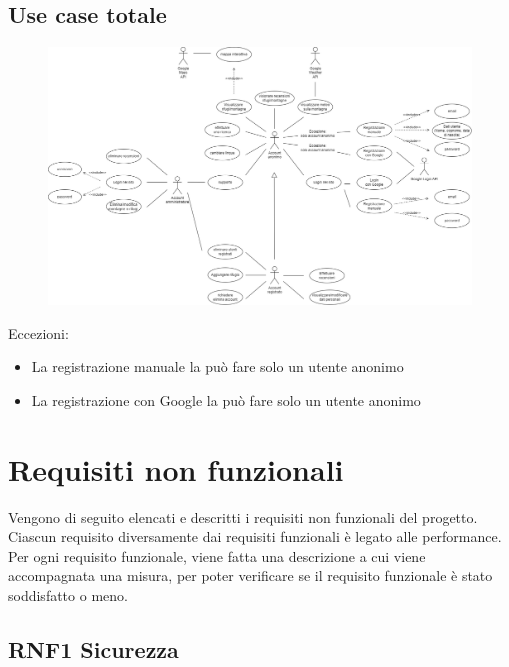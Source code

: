 \documentclass[a4paper,12pt]{article}
\begin{document}
\subsection*{Use case totale}
\begin{figure}[H]
   \centering
    \includegraphics[width=1.4\textwidth, angle = 90]{img-D2/use_case_completo.png}
    
\end{figure}
Eccezioni:
\begin{itemize}
    \item La registrazione manuale la può fare solo un utente anonimo
    \item La registrazione con Google la può fare solo un utente anonimo
\end{itemize}{}



{\newpage}
\section{Requisiti non funzionali}

Vengono di seguito elencati e descritti i requisiti non funzionali del progetto. Ciascun requisito diversamente dai requisiti funzionali è legato alle performance.\\
Per ogni requisito funzionale, viene fatta una descrizione a cui viene accompagnata una misura, per poter verificare se il requisito funzionale è stato soddisfatto o meno.

\subsection*{RNF1 Sicurezza}
\end{document}

